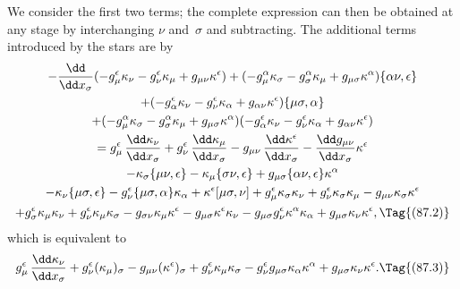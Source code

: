 \documentclass[12pt]{book}
\begin{document}
We consider the first two terms; the complete expression can then be
obtained at any stage by interchanging $\nu$ and~$\sigma$ and subtracting. The additional
terms introduced by the stars are by~
\begin{multline*}
  -\frac{\dd}{\dd x_{\sigma}} (-g_{\mu}^{\epsilon} \kappa_{\nu} - g_{\nu}^{\epsilon} \kappa_{\mu} + g_{\mu\nu} \kappa^{\epsilon})
  + (-g_{\mu}^{\alpha} \kappa_{\sigma} - g_{\sigma}^{\alpha} \kappa_{\mu} + g_{\mu\sigma} \kappa^{\alpha}) \{\alpha\nu, \epsilon\} \\
  + (-g_{\alpha}^{\epsilon} \kappa_{\nu} - g_{\nu}^{\epsilon} \kappa_{\alpha} + g_{\alpha\nu} \kappa^{\epsilon}) \{\mu\sigma, \alpha\} \\
  + (-g_{\mu}^{\alpha} \kappa_{\sigma} - g_{\sigma}^{\alpha} \kappa_{\mu} + g_{\mu\sigma} \kappa^{\alpha})
  (-g_{\alpha}^{\epsilon} \kappa_{\nu} - g_{\nu}^{\epsilon} \kappa_{\alpha} + g_{\alpha\nu} \kappa^{\epsilon}) \\
  = g_{\mu}^{\epsilon}\, \frac{\dd\kappa_{\nu}}{\dd x_{\sigma}}
  + g_{\nu}^{\epsilon}\, \frac{\dd\kappa_{\mu}}{\dd x_{\sigma}}
  - g_{\mu\nu}\, \frac{\dd\kappa^{\epsilon}}{\dd x_{\sigma}} - \frac{\dd g_{\mu\nu}}{\dd x_{\sigma}} \kappa^{\epsilon} \\
  - \kappa_{\sigma} \{\mu\nu, \epsilon\} - \kappa_{\mu} \{\sigma\nu, \epsilon\} + g_{\mu\sigma} \{\alpha\nu, \epsilon\} \kappa^{\alpha} \\
  - \kappa_{\nu} \{\mu\sigma, \epsilon\} - g_{\nu}^{\epsilon} \{\mu\sigma, \alpha\} \kappa_{\alpha}
  + \kappa^{\epsilon} [\mu\sigma, \nu]
  + g_{\mu}^{\epsilon} \kappa_{\sigma} \kappa_{\nu}
  + g_{\nu}^{\epsilon} \kappa_{\sigma} \kappa_{\mu}
  - g_{\mu\nu} \kappa_{\sigma} \kappa^{\epsilon} \\
  + g_{\sigma}^{\epsilon} \kappa_{\mu} \kappa_{\nu}
  + g_{\nu}^{\epsilon} \kappa_{\mu} \kappa_{\sigma}
  - g_{\sigma\nu} \kappa_{\mu} \kappa^{\epsilon}
  - g_{\mu\sigma} \kappa^{\epsilon} \kappa_{\nu}
  - g_{\mu\sigma} g_{\nu}^{\epsilon} \kappa^{\alpha} \kappa_{\alpha}
  + g_{\mu\sigma} \kappa_{\nu} \kappa^{\epsilon},
  \Tag{(87.2)}
\end{multline*}
which is equivalent to
\[
  g_{\mu}^{\epsilon}\, \frac{\dd\kappa_{\nu}}{\dd x_{\sigma}}
  + g_{\nu}^{\epsilon} (\kappa_{\mu})_{\sigma}
  - g_{\mu\nu} (\kappa^{\epsilon})_{\sigma}
  + g_{\nu}^{\epsilon} \kappa_{\mu} \kappa_{\sigma}
  - g_{\nu}^{\epsilon} g_{\mu\sigma} \kappa_{\alpha} \kappa^{\alpha}
  + g_{\mu\sigma} \kappa_{\nu} \kappa^{\epsilon}.
  \Tag{(87.3)}
\]
\end{document}
